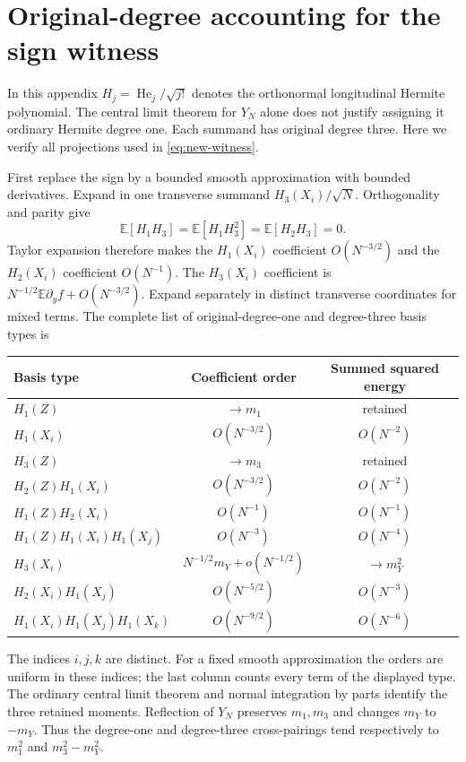 \documentclass[11pt]{article}
\newcommand{\E}{\mathbb E}
\begin{document}
\section{Original-degree accounting for the sign witness}\label{app:witness}
In this appendix $H_j=\operatorname{He}_j/\sqrt{j!}$ denotes the
orthonormal longitudinal Hermite polynomial.
The central limit theorem for $Y_N$ alone does not justify assigning it
ordinary Hermite degree one. Each summand has original degree three.
Here we verify all projections used in \eqref{eq:new-witness}.

First replace the sign by a bounded smooth approximation with bounded
derivatives. Expand in one transverse summand $H_3(X_i)/\sqrt N$.
Orthogonality and parity give
\[
 \E[H_1H_3]=\E[H_1H_3^2]=\E[H_2H_3]=0.
\]
Taylor expansion therefore makes the $H_1(X_i)$ coefficient
$O(N^{-3/2})$ and the $H_2(X_i)$ coefficient $O(N^{-1})$.
The $H_3(X_i)$ coefficient is
$N^{-1/2}\E\partial_y f+O(N^{-3/2})$.
Expand separately in distinct transverse coordinates for mixed terms.
The complete list of original-degree-one and degree-three basis types is
\begin{center}\small
\begin{tabular}{lcc}
Basis type & Coefficient order & Summed squared energy\\\hline
$H_1(Z)$ & $\to m_1$ & retained\\
$H_1(X_i)$ & $O(N^{-3/2})$ & $O(N^{-2})$\\
$H_3(Z)$ & $\to m_3$ & retained\\
$H_2(Z)H_1(X_i)$ & $O(N^{-3/2})$ & $O(N^{-2})$\\
$H_1(Z)H_2(X_i)$ & $O(N^{-1})$ & $O(N^{-1})$\\
$H_1(Z)H_1(X_i)H_1(X_j)$ & $O(N^{-3})$ & $O(N^{-4})$\\
$H_3(X_i)$ & $N^{-1/2}m_Y+o(N^{-1/2})$ & $\to m_Y^2$\\
$H_2(X_i)H_1(X_j)$ & $O(N^{-5/2})$ & $O(N^{-3})$\\
$H_1(X_i)H_1(X_j)H_1(X_k)$ & $O(N^{-9/2})$ & $O(N^{-6})$\\\hline
\end{tabular}
\end{center}
The indices $i,j,k$ are distinct. For a fixed smooth approximation the
orders are uniform in these indices; the last column counts every term
of the displayed type. The ordinary central limit theorem and normal
integration by parts identify the three retained moments.
Reflection of $Y_N$ preserves $m_1,m_3$ and changes $m_Y$ to $-m_Y$.
Thus the degree-one and degree-three cross-pairings tend respectively
to $m_1^2$ and $m_3^2-m_Y^2$.
\end{document}

